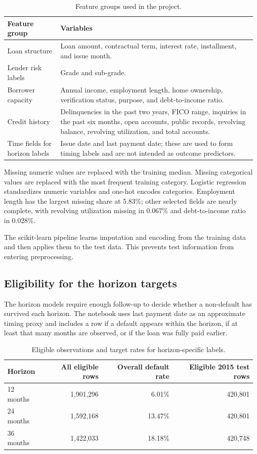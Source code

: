 \documentclass[11pt]{article}
\begin{document}
\begin{table}[H]
\centering
\caption{Feature groups used in the project.}
\label{tab:features}
\begin{tabularx}{\textwidth}{@{}p{}X@{}}
\toprule
Feature group & Variables \\
\midrule
Loan structure & Loan amount, contractual term, interest rate, installment, and issue month. \\
Lender risk labels & Grade and sub-grade. \\
Borrower capacity & Annual income, employment length, home ownership, verification status, purpose, and debt-to-income ratio. \\
Credit history & Delinquencies in the past two years, FICO range, inquiries in the past six months, open accounts, public records, revolving balance, revolving utilization, and total accounts. \\
Time fields for horizon labels & Issue date and last payment date; these are used to form timing labels and are not intended as outcome predictors. \\
\bottomrule
\end{tabularx}
\end{table}

Missing numeric values are replaced with the training median. Missing categorical
values are replaced with the most frequent training category. Logistic regression
standardizes numeric variables and one-hot encodes categories. Employment length
has the largest missing share at 5.83\%; other selected fields are nearly complete,
with revolving utilization missing in 0.067\% and debt-to-income ratio in 0.028\%.

The scikit-learn pipeline learns imputation and encoding from the training data
and then applies them to the test data. This prevents test information from
entering preprocessing.

\subsection{Eligibility for the horizon targets}

The horizon models require enough follow-up to decide whether a non-default has
survived each horizon. The notebook uses last payment date as an approximate timing
proxy and includes a row if a default appears within the horizon, if at least that
many months are observed, or if the loan was fully paid earlier.

\begin{table}[H]
\centering
\caption{Eligible observations and target rates for horizon-specific labels.}
\label{tab:horizon-populations}
\begin{tabular}{lrrr}
\toprule
Horizon & All eligible rows & Overall default rate & Eligible 2015 test rows \\
\midrule
12 months & 1,901,296 & 6.01\% & 420,801 \\
24 months & 1,592,168 & 13.47\% & 420,801 \\
36 months & 1,422,033 & 18.18\% & 420,748 \\
\bottomrule
\end{tabular}
\end{table}
\end{document}
